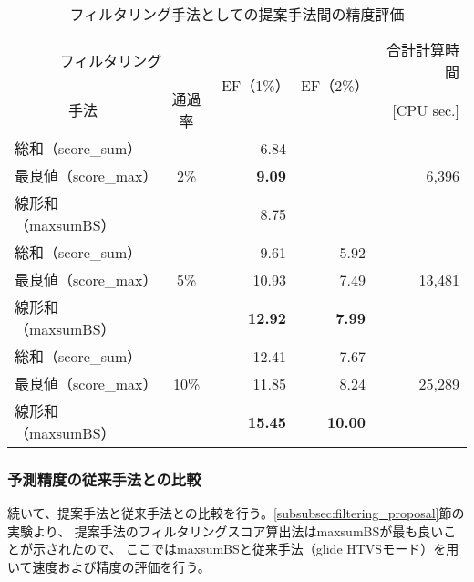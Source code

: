 \begin{table}[htb] \centering
	\caption{フィルタリング手法としての提案手法間の精度評価}
	\label{table:filtering_proposal}
	\begin{tabular}{lc|rr|r}
	\hline
	\multicolumn{2}{c|}{フィルタリング}	&\multirow{2}{*}{EF（1\%）}	&\multirow{2}{*}{EF（2\%）}	&合計計算時間	\\
	\multicolumn{1}{c}{手法}	&通過率	&						&						&[CPU sec.]		\\ \hline
	総和（score\_sum）		&		&6.84					&\textendash				&				\\
	最良値（score\_max）	&2\%	&\textbf{9.09}				&\textendash				&6,396			\\
	線形和（maxsumBS）	&		&8.75					&\textendash				&				\\ \hline
	総和（score\_sum）		&		&9.61					&5.92					&				\\
	最良値（score\_max）	&5\%	&10.93					&7.49					&13,481			\\
	線形和（maxsumBS）	&		&\textbf{12.92}			&\textbf{7.99}				&				\\ \hline
	総和（score\_sum）		&		&12.41					&7.67					&				\\
	最良値（score\_max）	&10\%	&11.85					&8.24					&25,289			\\
	線形和（maxsumBS）	&		&\textbf{15.45}			&\textbf{10.00}			&				\\ \hline
	\end{tabular}
\end{table}


\subsubsection{予測精度の従来手法との比較}\label{subsubsec:filtering_comparison}
続いて、提案手法と従来手法との比較を行う。\ref{subsubsec:filtering_proposal}節の実験より、
提案手法のフィルタリングスコア算出法はmaxsumBSが最も良いことが示されたので、
ここではmaxsumBSと従来手法（glide HTVSモード）を用いて速度および精度の評価を行う。

